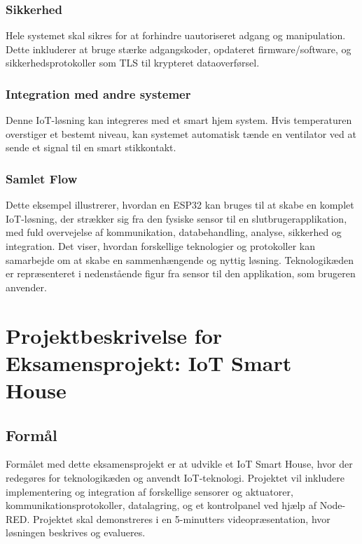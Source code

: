 \subsection*{Sikkerhed}
Hele systemet skal sikres for at forhindre uautoriseret adgang og manipulation. Dette inkluderer at bruge stærke adgangskoder, opdateret firmware/software, og sikkerhedsprotokoller som TLS til krypteret dataoverførsel.

\subsection*{Integration med andre systemer}
Denne IoT-løsning kan integreres med et smart hjem system. Hvis temperaturen overstiger et bestemt niveau, kan systemet automatisk tænde en ventilator ved at sende et signal til en smart stikkontakt.

\subsection{Samlet Flow}
Dette eksempel illustrerer, hvordan en ESP32 kan bruges til at skabe en komplet IoT-løsning, der strækker sig fra den fysiske sensor til en slutbrugerapplikation, med fuld overvejelse af kommunikation, databehandling, analyse, sikkerhed og integration. Det viser, hvordan forskellige teknologier og protokoller kan samarbejde om at skabe en sammenhængende og nyttig løsning.
\newline\newline\noindent
Teknologikæden er repræsenteret i nedenstående figur fra sensor til den applikation, som brugeren anvender.


\chapter{Projektbeskrivelse for Eksamensprojekt: IoT Smart House}
\section*{Formål}
Formålet med dette eksamensprojekt er at udvikle et IoT Smart House, hvor der redegøres for teknologikæden og anvendt IoT-teknologi. Projektet vil inkludere implementering og integration af forskellige sensorer og aktuatorer, kommunikationsprotokoller, datalagring, og et kontrolpanel ved hjælp af Node-RED. Projektet skal demonstreres i en 5-minutters videopræsentation, hvor løsningen beskrives og evalueres.


